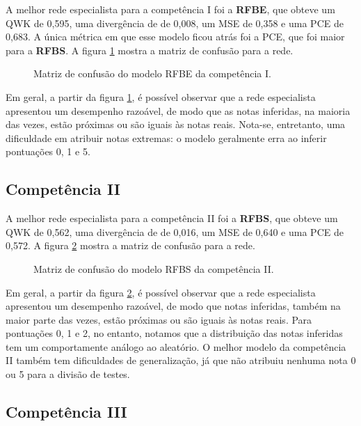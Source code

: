 A melhor rede especialista para a competência I foi a \textbf{RFBE}, que obteve um QWK de 0,595, uma divergência de de 0,008, um MSE de 0,358 e uma PCE de 0,683. A única métrica em que esse modelo ficou atrás foi a PCE, que foi maior para a \textbf{RFBS}. A figura \ref{fig:eval-c1-confusion-matrix} mostra a matriz de confusão para a rede.

\begin{figure}[H]
    \centering
    \resizebox{0.5\textwidth}{!}{}
    \caption{Matriz de confusão do modelo RFBE da competência I.}
    \label{fig:eval-c1-confusion-matrix}
\end{figure}

Em geral, a partir da figura \ref{fig:eval-c1-confusion-matrix}, é possível observar que a rede especialista apresentou um desempenho razoável, de modo que as notas inferidas, na maioria das vezes, estão próximas ou são iguais às notas reais. Nota-se, entretanto, uma dificuldade em atribuir notas extremas: o modelo geralmente erra ao inferir pontuações 0, 1 e 5.

\subsection{Competência II}
\label{subsec:eval-c2}

A melhor rede especialista para a competência II foi a \textbf{RFBS}, que obteve um QWK de 0,562, uma divergência de de 0,016, um MSE de 0,640 e uma PCE de 0,572. A figura \ref{fig:eval-c2-confusion-matrix} mostra a matriz de confusão para a rede.

\begin{figure}[H]
    \centering
    \resizebox{0.5\textwidth}{!}{}
    \caption{Matriz de confusão do modelo RFBS da competência II.}
    \label{fig:eval-c2-confusion-matrix}
\end{figure}

Em geral, a partir da figura \ref{fig:eval-c2-confusion-matrix}, é possível observar que a rede especialista apresentou um desempenho razoável, de modo que notas inferidas, também na maior parte das vezes, estão próximas ou são iguais às notas reais. Para pontuações 0, 1 e 2, no entanto, notamos que a distribuição das notas inferidas tem um comportamente análogo ao aleatório. O melhor modelo da competência II também tem dificuldades de generalização, já que não atribuiu nenhuma nota 0 ou 5 para a divisão de testes.

\subsection{Competência III}
\label{subsec:eval-c3}

